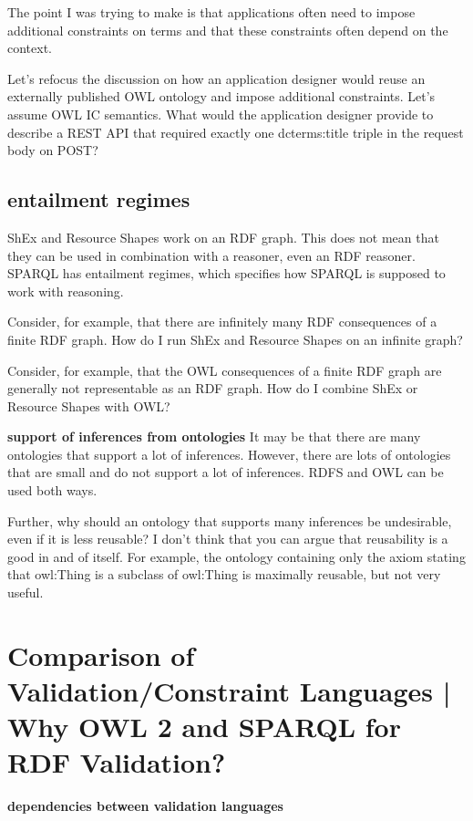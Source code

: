 \documentclass{llncs}
\begin{document}
The point I was trying to make is that applications often need to impose 
additional constraints on terms and that these constraints often depend on 
the context. 

Let's refocus the discussion on how an application designer would reuse an 
externally published OWL ontology and impose additional constraints. Let's 
assume OWL IC semantics. What would the application designer provide to 
describe a REST API that required exactly one dcterms:title triple in the 
request body on POST? 


\subsection{entailment regimes}

ShEx and Resource Shapes work on an RDF graph.  This does not mean that they 
can be used in combination with a reasoner, even an RDF reasoner.  SPARQL has 
entailment regimes, which specifies how SPARQL is supposed to work with reasoning.

Consider, for example, that there are infinitely many RDF consequences of a 
finite RDF graph.  How do I run ShEx and Resource Shapes on an infinite graph?

Consider, for example, that the OWL consequences of a finite RDF graph are 
generally not representable as an RDF graph.  How do I combine ShEx or 
Resource Shapes with OWL?

\textbf{support of inferences from ontologies}
It may be that there are many ontologies that support a lot of inferences.
However, there are lots of ontologies that are small and do not support a
lot of inferences.  RDFS and OWL can be used both ways.

Further, why should an ontology that supports many inferences be
undesirable, even if it is less reusable?  I don't think that you can argue
that reusability is a good in and of itself.  For example, the ontology
containing only the axiom stating that owl:Thing is a subclass of owl:Thing
is maximally reusable, but not very useful.

\section{Comparison of Validation/Constraint Languages | Why OWL 2 and SPARQL for RDF Validation?}

\textbf{dependencies between validation languages}
\end{document}
